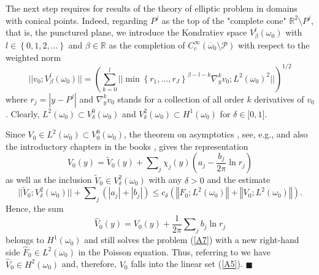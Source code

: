 \documentclass[11pt]{article}%
\numberwithin{equation}{section}
\begin{document}
The next step requires for results \cite{Ko} of the theory of elliptic problem
in domains with conical points. Indeed, regarding $P^{j}$ as the top of the
"complete cone" $\mathbb{R}^{2}\setminus P^{j}$, that is, the punctured plane,
we introduce the Kondratiev space $V_{\beta}^{l}(\omega_{0})$ with
$l\in\left\{  0,1,2,...\right\}  $ and $\beta\in\mathbb{R}$ as the completion
of $C_{c}^{\infty}(\overline{\omega}_{0}\setminus\mathcal{P})$ with
respect to the weighted norm%
\begin{equation}
||v_{0};V_{\beta}^{l}(\omega_{0})||=\left(
{\textstyle\sum\limits_{k=0}^{l}}
||\min\left\{  r_{1},...,r_{J}\right\}  ^{\beta-l-k}\nabla_{y}^{k}v_{0}%
;L^{2}(\omega_{0})^{2}||\right)  ^{1/2} \label{A8}%
\end{equation}
where $r_{j}=|y-P^{j}|$ and $\nabla_{y}^{k}v_{0}$ stands for a collection of
all order $k$ derivatives of $v_{0}$. Clearly, $L^{2}(\omega_{0})\subset
V_{\delta}^{0}(\omega_{0})$ and $V_{\delta}^{2}(\omega_{0})\subset
H^{1}(\omega_{0})$ for $\delta\in\lbrack0,1]$.

Since $V_{0}\in L^{2}(\omega_{0})\subset V_{0}^{0}(\omega_{0})$, the theorem
on asymptotics \cite{Ko}, see, e.g., \cite[\S 3.5, \S 4.2, \S 6.4]{NaPl} and
also the introductory chapters in the books \cite{NaPl, KoMaRo1}, gives the
representation%
\begin{equation}
V_{0}(y)=\widetilde{V}_{0}(y)+%
{\textstyle\sum\nolimits_{j}}
\chi_{j}(y)\left(  a_{j}-\frac{b_{j}}{2\pi}\ln r_{j}\right)  \label{A9}%
\end{equation}
as well as the inclusion $\widetilde{V}_{0}\in V_{\delta}^{2}(\omega_{0})$
with any $\delta>0$ and the estimate%
\begin{equation}
||\widetilde{V}_{0};V_{\delta}^{2}(\omega_{0})||+%
{\textstyle\sum\nolimits_{j}}
(|a_{j}|+|b_{j}|)\leq c_{\delta}(\left\Vert F_{0};L^{2}(\omega_{0})\right\Vert
+\left\Vert V_{0};L^{2}(\omega_{0})\right\Vert ). \label{A10}%
\end{equation}
Hence, the sum%
\begin{equation}
\widehat{V}_{0}(y)=V_{0}(y)+\frac{1}{2\pi}\sum\nolimits_{j}b_{j}\ln r_{j}
\label{A99}%
\end{equation}
belongs to $H^{1}(\omega_{0})$ and still solves the problem (\ref{A7}) with a
new right-hand side $\widehat{F}_{0}\in L^{2}(\omega_{0})$ in the Poisson
equation. Thus, referring to \cite[\S 9, Ch. 2]{LiMa} we have $\widehat{V}%
_{0}\in H^{2}(\omega_{0})$ and, therefore, $V_{0}$ falls into the linear set
(\ref{A5}). $\blacksquare$
\end{document}
